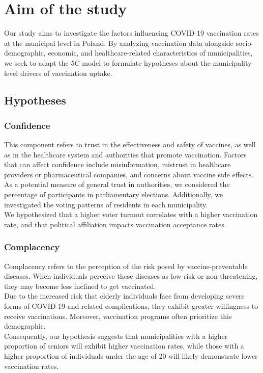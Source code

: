 \documentclass[a4paper,12pt]{article} %
\begin{document}
\section{Aim of the study}
Our study aims to investigate the factors influencing COVID-19 vaccination rates at the municipal level in Poland. By analyzing vaccination data alongside socio-demographic, economic, and healthcare-related characteristics of municipalities, we seek to adapt the 5C model to formulate hypotheses about the municipality-level drivers of vaccination uptake. 
\subsection{Hypotheses}
\subsubsection{Confidence}
This component refers to trust in the effectiveness and safety of vaccines, as well as in the healthcare system and authorities that promote vaccination. Factors that can affect confidence include misinformation, mistrust in healthcare providers or pharmaceutical companies, and concerns about vaccine side effects.
As a potential measure of general trust in authorities, we considered the percentage of participants in parliamentary elections. Additionally, we investigated the voting patterns of residents in each municipality.
\\
We hypothesized that a higher voter turnout correlates with a higher vaccination rate, and that political affiliation impacts vaccination acceptance rates. 
\subsubsection{Complacency}
Complacency refers to the perception of the risk posed by vaccine-preventable diseases. When individuals perceive these diseases as low-risk or non-threatening, they may become less inclined to get vaccinated.
\\
Due to the increased risk that elderly individuals face from developing severe forms of COVID-19 and related complications, they exhibit greater willingness to receive vaccinations. Moreover, vaccination programs often prioritize this demographic. 
\\
Consequently, our hypothesis suggests that municipalities with a higher proportion of seniors will exhibit higher vaccination rates, while those with a higher proportion of individuals under the age of 20 will likely demonstrate lower vaccination rates.
\end{document}
